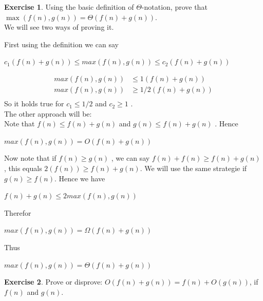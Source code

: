 \documentclass{article}
\theoremstyle{definition}
\newtheorem{exercise}{Exercise}[section]
\begin{document}
\begin{exercise}
    Using the basic definition of $\Theta$-notation, prove that $\max(f(n), g(n)) = \Theta(f(n) + g(n))$.\\
    We will see two ways of proving it.

    First using the definition we can say
    \begin{center}
        $c_1(f(n)+g(n)) \leqslant max(f(n),g(n)) \leqslant c_2(f(n)+g(n))$        
    \end{center}
    \begin{align*}
        max(f(n),g(n)) &\leqslant 1(f(n)+g(n))\\
        max(f(n),g(n)) &\geqslant 1/2(f(n)+g(n))\\
    \end{align*}
    So it holds true for $c_1 \leqslant 1/2 $ and $c_2 \geqslant 1$ .\\

    The other approach will be:\\
    Note that $f(n)\leqslant f(n)+g(n)$ and $g(n)\leqslant f(n)+g(n)$ . Hence
    \begin{center}
        $max(f(n),g(n)) = O(f(n)+g(n))$
    \end{center}
    Now note that if $f(n) \geqslant g(n)$ , we can say $f(n)+f(n)\geqslant f(n)+g(n)$ , this equals  $2(f(n)) \geqslant f(n)+g(n)$. We will use the same strategie if $g(n) \geqslant f(n)$.
    Hence we have
    \begin{center}
        $f(n)+g(n) \leqslant 2 max(f(n),g(n))$
    \end{center}
    Therefor
    \begin{center}
        $max(f(n),g(n)) = \Omega(f(n)+g(n))$ 
    \end{center}
    Thus
    \begin{center}
        $max(f(n),g(n)) = \Theta(f(n)+g(n))$ 
    \end{center}
\end{exercise}

\begin{exercise}

    Prove or disprove: $O(f(n) + g(n)) = f(n) + O(g(n))$, if $f(n)$ and $g(n)$.
\end{exercise}
\end{document}
